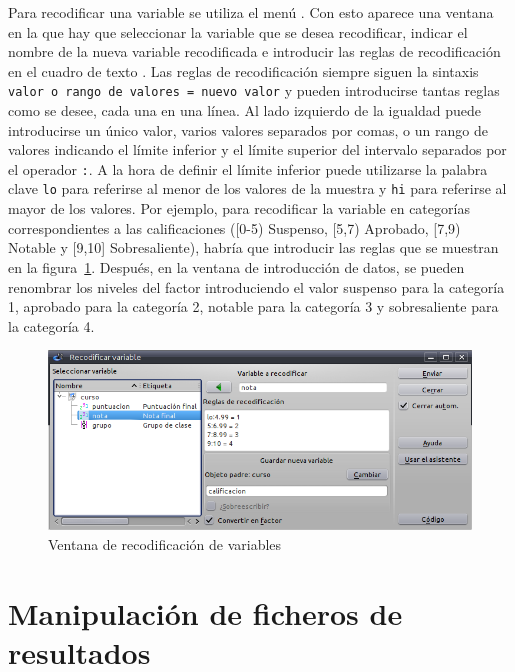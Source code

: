 Para recodificar una variable se utiliza el menú .
Con esto aparece una ventana en la que hay que seleccionar la variable que se desea recodificar, indicar el nombre de la
nueva variable recodificada e introducir las reglas de recodificación en el cuadro de texto .
Las reglas de recodificación siempre siguen la sintaxis \lstinline{valor o rango de valores = nuevo valor} y pueden
introducirse tantas reglas como se desee, cada una en una línea.
Al lado izquierdo de la igualdad puede introducirse un único valor, varios valores separados por comas, o un rango de
valores indicando el límite inferior y el límite superior del intervalo separados por el operador \lstinline{:}.
A la hora de definir el límite inferior puede utilizarse la palabra clave \lstinline{lo} para referirse al menor de los
valores de la muestra y \lstinline{hi} para referirse al mayor de los valores.
Por ejemplo, para recodificar la variable  en categorías correspondientes a las calificaciones ([0-5)
Suspenso, [5,7) Aprobado, [7,9) Notable y [9,10] Sobresaliente), habría que introducir las reglas que se muestran en la
figura~\ref{g:recodificar_variable}. Después, en la ventana de introducción de datos, se pueden renombrar los niveles
del factor introduciendo el valor suspenso para la categoría 1, aprobado para la categoría 2, notable para la categoría
3 y sobresaliente para la categoría 4. 

\begin{figure}[htp]
\begin{center}
  \includegraphics[scale=0.6]{introduccion_r/img/recodificar}
  \caption{Ventana de recodificación de variables}
  \label{g:recodificar_variable}
\end{center}
\end{figure} 


\section{Manipulación de ficheros de resultados}

